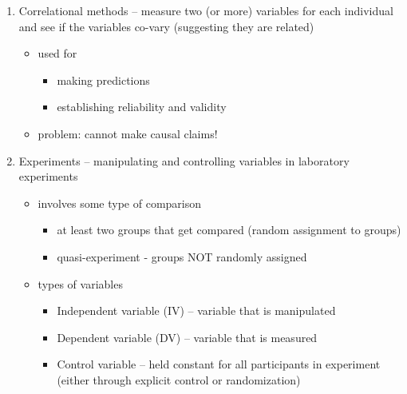 \documentclass[11pt]{article}
\begin{document}
\begin{enumerate}
\item Correlational methods -- measure two (or more) variables for each individual and see if the variables co-vary (suggesting they are related)
\begin{itemize}
\item used for
\begin{itemize}
\item making predictions
\item establishing reliability and validity
\end{itemize}
\item problem: cannot make causal claims!
\end{itemize}

\item Experiments -- manipulating and controlling variables in laboratory experiments
\begin{itemize}
\item involves some type of comparison
\begin{itemize}
\item at least two groups that get compared (random assignment to groups)
\item quasi-experiment - groups NOT randomly assigned
\end{itemize}
\item types of variables
\begin{itemize}
\item Independent variable (IV) -- variable that is manipulated
\item Dependent variable (DV) -- variable that is measured
\item Control variable -- held constant for all participants in experiment (either through explicit control or randomization)
\end{itemize}
\end{itemize}
\end{enumerate}
\end{document}
